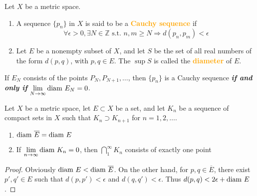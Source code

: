 \begin{definition}
Let $X$ be a metric space.
\begin{enumerate}[label={(\arabic*)}]
\item A sequence $\{p_n\}$ in $X$ is said to be a \textbf{\textcolor{orange}{Cauchy sequence}} if $$\forall \epsilon>0, \exists N\in \mathbb{Z}\text{ s.t. }n,m\geq N \Rightarrow d(p_n,p_m)<\epsilon$$
\item Let $E$ be a nonempty subset of $X$, and let $S$ be the set of all real numbers of the form $d(p,q)$, with $p,q\in E$. The $\sup S$ is called the \textbf{\textcolor{orange}{diameter}} of $E$.
\end{enumerate}
If $E_N$ consists of the points $P_N, P_{N+1},\dots$, then $\{p_n\}$ is a Cauchy sequence \textbf{\emph{if and only if}} $\lim\limits_{N\to \infty}\text{diam } E_N=0$.
\end{definition}

\begin{theorem}
Let $X$ be a metric space, let $E\subset X$ be a set, and let $K_n$ be a sequence of compact sets in $X$ such that $K_n\supset K_{n+1}$ for $n=1,2,\dots$.
\begin{enumerate}[label={(\arabic*)}]
\item $\text{diam } \overline{E} = \text{diam } E$
\item If $\lim\limits_{n\to \infty}\text{diam } K_n=0$, then $\bigcap_1^\infty K_n$ consists of exactly one point
\end{enumerate}
\end{theorem}
\begin{proof}
 Obviously $\text{diam } E < \text{diam } \overline{E}$. On the other hand, for $p,q\in \overline{E}$, there exist $p',q'\in E$ such that $d(p,p')<\epsilon$ and $d(q,q')<\epsilon$. Thus $d(p,q)<2\epsilon + \text{diam } E$.
\end{proof}

